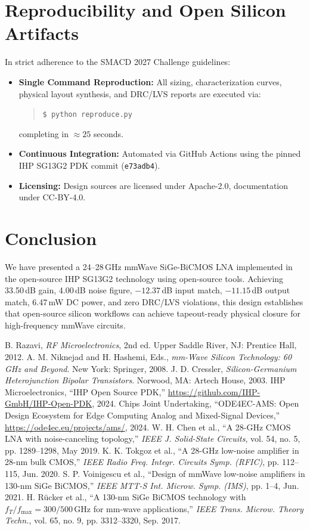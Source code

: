 \documentclass[conference]{IEEEtran}
\begin{document}
\section{Reproducibility and Open Silicon Artifacts}
In strict adherence to the SMACD 2027 Challenge guidelines:
\begin{itemize}
    \item \textbf{Single Command Reproduction:} All sizing, characterization curves, physical layout synthesis, and DRC/LVS reports are executed via:
    \begin{quote}
    \texttt{\$ python reproduce.py}
    \end{quote}
    completing in $\approx 25$ seconds.
    \item \textbf{Continuous Integration:} Automated via GitHub Actions using the pinned IHP SG13G2 PDK commit (\texttt{e73adb4}).
    \item \textbf{Licensing:} Design sources are licensed under Apache-2.0, documentation under CC-BY-4.0.
\end{itemize}

\section{Conclusion}
We have presented a 24--28\,GHz mmWave SiGe-BiCMOS LNA implemented in the open-source IHP SG13G2 technology using open-source tools. Achieving 33.50\,dB gain, 4.00\,dB noise figure, $-12.37$\,dB input match, $-11.15$\,dB output match, 6.47\,mW DC power, and zero DRC/LVS violations, this design establishes that open-source silicon workflows can achieve tapeout-ready physical closure for high-frequency mmWave circuits.

\begin{thebibliography}{00}
 B. Razavi, \textit{RF Microelectronics}, 2nd ed. Upper Saddle River, NJ: Prentice Hall, 2012.
 A. M. Niknejad and H. Hashemi, Eds., \textit{mm-Wave Silicon Technology: 60 GHz and Beyond}. New York: Springer, 2008.
 J. D. Cressler, \textit{Silicon-Germanium Heterojunction Bipolar Transistors}. Norwood, MA: Artech House, 2003.
 IHP Microelectronics, ``IHP Open Source PDK,'' \url{https://github.com/IHP-GmbH/IHP-Open-PDK}, 2024.
 Chips Joint Undertaking, ``ODE4EC-AMS: Open Design Ecosystem for Edge Computing Analog and Mixed-Signal Devices,'' \url{https://ode4ec.eu/projects/ams/}, 2024.
 W. H. Chen et al., ``A 28-GHz CMOS LNA with noise-canceling topology,'' \textit{IEEE J. Solid-State Circuits}, vol. 54, no. 5, pp. 1289--1298, May 2019.
 K. K. Tokgoz et al., ``A 28-GHz low-noise amplifier in 28-nm bulk CMOS,'' \textit{IEEE Radio Freq. Integr. Circuits Symp. (RFIC)}, pp. 112--115, Jun. 2020.
 S. P. Voinigescu et al., ``Design of mmWave low-noise amplifiers in 130-nm SiGe BiCMOS,'' \textit{IEEE MTT-S Int. Microw. Symp. (IMS)}, pp. 1--4, Jun. 2021.
 H. R\"ucker et al., ``A 130-nm SiGe BiCMOS technology with $f_T/f_{\max} = 300/500$\,GHz for mm-wave applications,'' \textit{IEEE Trans. Microw. Theory Techn.}, vol. 65, no. 9, pp. 3312--3320, Sep. 2017.
\end{thebibliography}
\end{document}
